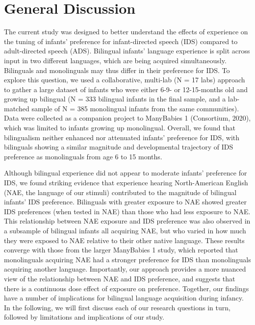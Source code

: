 \documentclass[,man,floatsintext]{apa6}
\begin{document}
\hypertarget{general-discussion}{%
\section{General Discussion}\label{general-discussion}}

The current study was designed to better understand the effects of experience on the tuning of infants' preference for infant-directed speech (IDS) compared to adult-directed speech (ADS). Bilingual infants' language experience is split across input in two different languages, which are being acquired simultaneously. Bilinguals and monolinguals may thus differ in their preference for IDS. To explore this question, we used a collaborative, multi-lab (N = 17 labs) approach to gather a large dataset of infants who were either 6-9- or 12-15-months old and growing up bilingual (N = 333 bilingual infants in the final sample, and a lab-matched sample of N = 385 monolingual infants from the same communities). Data were collected as a companion project to ManyBabies 1 (Consortium, 2020), which was limited to infants growing up monolingual. Overall, we found that bilingualism neither enhanced nor attenuated infants' preference for IDS, with bilinguals showing a similar magnitude and developmental trajectory of IDS preference as monolinguals from age 6 to 15 months.

Although bilingual experience did not appear to moderate infants' preference for IDS, we found striking evidence that experience hearing North-American English (NAE, the language of our stimuli) contributed to the magnitude of bilingual infants' IDS preference. Bilinguals with greater exposure to NAE showed greater IDS preferences (when tested in NAE) than those who had less exposure to NAE. This relationship between NAE exposure and IDS preference was also observed in a subsample of bilingual infants all acquiring NAE, but who varied in how much they were exposed to NAE relative to their other native language. These results converge with those from the larger ManyBabies 1 study, which reported that monolinguals acquiring NAE had a stronger preference for IDS than monolinguals acquiring another language. Importantly, our approach provides a more nuanced view of the relationship between NAE and IDS preference, and suggests that there is a continuous dose effect of exposure on preference. Together, our findings have a number of implications for bilingual language acquisition during infancy. In the following, we will first discuss each of our research questions in turn, followed by limitations and implications of our study.
\end{document}
